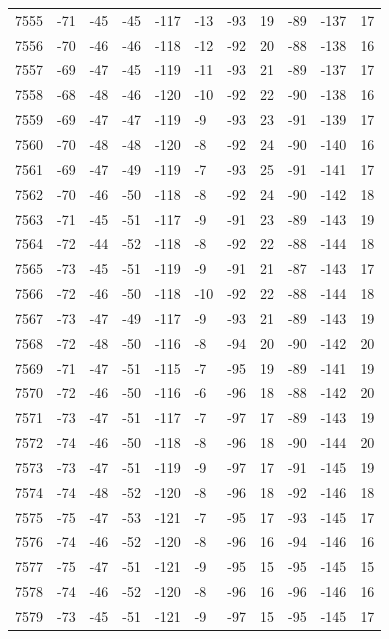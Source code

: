 \begin{table}[H]
\begin{tabular}{lllllllllll}
7555 & -71 & -45 & -45 & -117 & -13 & -93 & 19 & -89 & -137 & 17 \\
7556 & -70 & -46 & -46 & -118 & -12 & -92 & 20 & -88 & -138 & 16 \\
7557 & -69 & -47 & -45 & -119 & -11 & -93 & 21 & -89 & -137 & 17 \\
7558 & -68 & -48 & -46 & -120 & -10 & -92 & 22 & -90 & -138 & 16 \\
7559 & -69 & -47 & -47 & -119 & -9 & -93 & 23 & -91 & -139 & 17 \\
7560 & -70 & -48 & -48 & -120 & -8 & -92 & 24 & -90 & -140 & 16 \\
7561 & -69 & -47 & -49 & -119 & -7 & -93 & 25 & -91 & -141 & 17 \\
7562 & -70 & -46 & -50 & -118 & -8 & -92 & 24 & -90 & -142 & 18 \\
7563 & -71 & -45 & -51 & -117 & -9 & -91 & 23 & -89 & -143 & 19 \\
7564 & -72 & -44 & -52 & -118 & -8 & -92 & 22 & -88 & -144 & 18 \\
7565 & -73 & -45 & -51 & -119 & -9 & -91 & 21 & -87 & -143 & 17 \\
7566 & -72 & -46 & -50 & -118 & -10 & -92 & 22 & -88 & -144 & 18 \\
7567 & -73 & -47 & -49 & -117 & -9 & -93 & 21 & -89 & -143 & 19 \\
7568 & -72 & -48 & -50 & -116 & -8 & -94 & 20 & -90 & -142 & 20 \\
7569 & -71 & -47 & -51 & -115 & -7 & -95 & 19 & -89 & -141 & 19 \\
7570 & -72 & -46 & -50 & -116 & -6 & -96 & 18 & -88 & -142 & 20 \\
7571 & -73 & -47 & -51 & -117 & -7 & -97 & 17 & -89 & -143 & 19 \\
7572 & -74 & -46 & -50 & -118 & -8 & -96 & 18 & -90 & -144 & 20 \\
7573 & -73 & -47 & -51 & -119 & -9 & -97 & 17 & -91 & -145 & 19 \\
7574 & -74 & -48 & -52 & -120 & -8 & -96 & 18 & -92 & -146 & 18 \\
7575 & -75 & -47 & -53 & -121 & -7 & -95 & 17 & -93 & -145 & 17 \\
7576 & -74 & -46 & -52 & -120 & -8 & -96 & 16 & -94 & -146 & 16 \\
7577 & -75 & -47 & -51 & -121 & -9 & -95 & 15 & -95 & -145 & 15 \\
7578 & -74 & -46 & -52 & -120 & -8 & -96 & 16 & -96 & -146 & 16 \\
7579 & -73 & -45 & -51 & -121 & -9 & -97 & 15 & -95 & -145 & 17 \\

\end{tabular}
\end{table}
